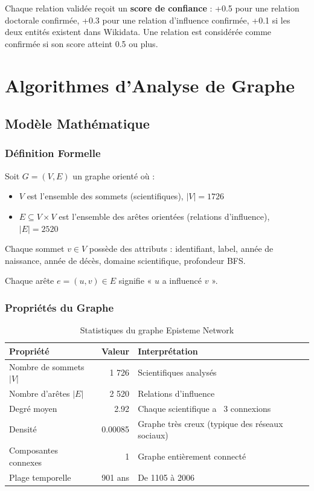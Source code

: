 \documentclass[12pt,a4paper]{report}
\begin{document}
Chaque relation validée reçoit un \textbf{score de confiance} : +0.5 pour une relation doctorale confirmée, +0.3 pour une relation d'influence confirmée, +0.1 si les deux entités existent dans Wikidata. Une relation est considérée comme confirmée si son score atteint 0.5 ou plus.

\chapter{Algorithmes d'Analyse de Graphe}

\section{Modèle Mathématique}

\subsection{Définition Formelle}

Soit $G = (V, E)$ un graphe orienté où :
\begin{itemize}
    \item $V$ est l'ensemble des sommets (scientifiques), $|V| = 1726$
    \item $E \subseteq V \times V$ est l'ensemble des arêtes orientées (relations d'influence), $|E| = 2520$
\end{itemize}

Chaque sommet $v \in V$ possède des attributs : identifiant, label, année de naissance, année de décès, domaine scientifique, profondeur BFS.

Chaque arête $e = (u, v) \in E$ signifie « $u$ a influencé $v$ ».

\subsection{Propriétés du Graphe}

\begin{table}[H]
\centering
\begin{tabular}{|l|r|l|}
\hline
\rowcolor{ice500!20}
\textbf{Propriété} & \textbf{Valeur} & \textbf{Interprétation} \\
\hline
Nombre de sommets $|V|$ & 1 726 & Scientifiques analysés \\
\hline
Nombre d'arêtes $|E|$ & 2 520 & Relations d'influence \\
\hline
Degré moyen & 2.92 & Chaque scientifique a ~3 connexions \\
\hline
Densité & 0.00085 & Graphe très creux (typique des réseaux sociaux) \\
\hline
Composantes connexes & 1 & Graphe entièrement connecté \\
\hline
Plage temporelle & 901 ans & De 1105 à 2006 \\
\hline
\end{tabular}
\caption{Statistiques du graphe Episteme Network}
\end{table}
\end{document}

